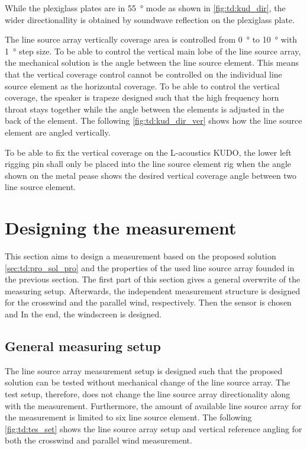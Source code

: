 
While the plexiglass plates are in \SI{55}{\degree} mode as shown in \autoref{fig:td:kud_dir}, the wider directionallity is obtained by soundwave reflection on the plexiglass plate.

The line source array vertically coverage area is controlled from \SI{0}{\degree} to \SI{10}{\degree} with \SI{1}{\degree} step size. To be able to control the vertical main lobe of the line source array, the mechanical solution is the angle between the line source element. This means that the vertical coverage control cannot be controlled on the individual line source element as the horizontal coverage. To be able to control the vertical coverage, the speaker is trapeze designed such that the high frequency horn throat stays together while the angle between the elements is adjusted in the back of the element. The following \autoref{fig:td:kud_dir_ver} shows how the line source element are angled vertically.


To be able to fix the vertical coverage on the L-acoustics KUDO, the lower left rigging pin shall only be placed into the line source element rig when the angle shown on the metal pease shows the desired vertical coverage angle between two line source element.  


\section{Designing the measurement}\label{sec:des:des_mes}
This section aims to design a measurement based on the proposed solution \autoref{sec:td:pro_sol_pro} and the properties of the used line source array founded in the previous section. The first part of this section gives a general overwrite of the measuring setup. Afterwards, the independent measurement structure is designed for the crosswind and the parallel wind, respectively. Then the sensor is chosen and In the end, the windscreen is designed.


\subsection{General measuring setup}\label{sec:pro:test_setup}
The line source array measurement setup is designed such that the proposed solution can be tested without mechanical change of the line source array. The test setup, therefore, does not change the line source array directionality along with the measurement. Furthermore, the amount of available line source array for the measurement is limited to six line source element. The following \autoref{fig:td:tes_set} shows the line source array setup and vertical reference angling for both the crosswind and parallel wind measurement. 

